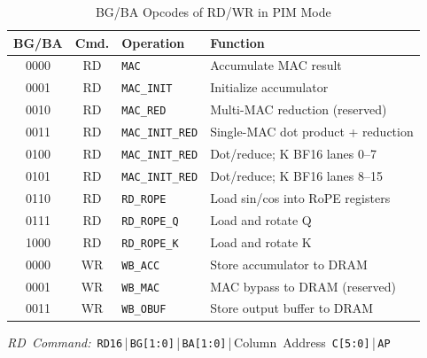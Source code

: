 \begin{table}[!t]
\caption{BG/BA Opcodes of RD/WR in PIM Mode}
\label{tab:isa}
\centering
\footnotesize
\setlength{\tabcolsep}{2.5pt}
\renewcommand{\arraystretch}{0.82}
\setlength{\aboverulesep}{1pt}
\setlength{\belowrulesep}{1pt}
\begin{tabularx}{\columnwidth}{@{}ccl>{\raggedright\arraybackslash}X@{}}
\toprule
\textbf{BG/BA} & \textbf{Cmd.} & \textbf{Operation} & \textbf{Function} \\
\midrule
0000 & RD & \texttt{MAC} & Accumulate MAC result \\
0001 & RD & \texttt{MAC\_INIT} & Initialize accumulator \\
0010 & RD & \texttt{MAC\_RED} & Multi-MAC reduction (reserved) \\
0011 & RD & \texttt{MAC\_INIT\_RED} & Single-MAC dot product + reduction \\
0100 & RD & \texttt{MAC\_INIT\_RED} & Dot/reduce; K BF16 lanes 0--7 \\
0101 & RD & \texttt{MAC\_INIT\_RED} & Dot/reduce; K BF16 lanes 8--15 \\
0110 & RD & \texttt{RD\_ROPE} & Load sin/cos into RoPE registers \\
0111 & RD & \texttt{RD\_ROPE\_Q} & Load and rotate Q \\
1000 & RD & \texttt{RD\_ROPE\_K} & Load and rotate K \\
\midrule
0000 & WR & \texttt{WB\_ACC} & Store accumulator to DRAM \\
0001 & WR & \texttt{WB\_MAC} & MAC bypass to DRAM (reserved) \\
0011 & WR & \texttt{WB\_OBUF} & Store output buffer to DRAM \\
\bottomrule
\end{tabularx}
\par\smallskip
\parbox{\columnwidth}{\scriptsize\mbox{\textit{RD Command:} \texttt{RD16}\,|\,\texttt{BG[1:0]}\,|\,\texttt{BA[1:0]}\,|\,Column Address \texttt{C[5:0]}\,|\,\texttt{AP}}}
\end{table}

